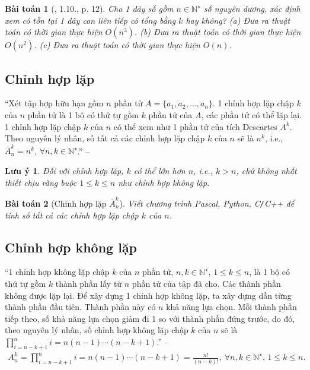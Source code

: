 \documentclass{article}
\newtheorem{baitoan}{Bài toán}
\newtheorem{luuy}{Lưu ý}
\begin{document}
\begin{baitoan}[\cite{TLGK_chuyen_Tin_quyen_1}, 1.10., p. 12]
	Cho 1 dãy số gồm $n\in\mathbb{N}^\star$ số nguyên dương, xác định xem có tồn tại 1 dãy con liên tiếp có tổng bằng $k$ hay không? (a) Đưa ra thuật toán có thời gian thực hiện $O(n^3)$. (b) Đưa ra thuật toán có thời gian thực hiện $O(n^2)$. (c) Đưa ra thuật toán có thời gian thực hiện $O(n)$.
\end{baitoan}

\subsection{Chỉnh hợp lặp}
``Xét tập hợp hữu hạn gồm $n$ phần tử $A = \{a_1,a_2,\ldots,a_n\}$. 1 chỉnh  hợp lặp chập $k$ của $n$ phần tử là 1 bộ có thứ tự gồm $k$ phần tử của $A$, các phần tử có thể lặp lại. 1 chỉnh hợp lặp chập $k$ của $n$ có thể xem như 1 phần tử của tích Descartes $A^k$. Theo nguyên lý nhân, số tất cả các chỉnh hợp lặp chập $k$ của $n$ sẽ là $n^k$, i.e., $\overline{A}_n^k = n^k$, $\forall n,k\in\mathbb{N}^\star$.'' -- \cite[Sect. 4.7, p. 20]{TLGK_chuyen_Tin_quyen_1}

\begin{luuy}
	Đối với chỉnh hợp lặp, $k$ có thể lớn hơn $n$, i.e., $k > n$, chứ không nhất thiết chịu ràng buộc $1\le k\le n$ như chỉnh hợp không lặp.
\end{luuy}

\begin{baitoan}[Chỉnh hợp lặp $\overline{A}_n^k$]
	Viết chương trình {\sf Pascal, Python, C\texttt{/}C++} để tính số tất cả các chỉnh hợp lặp chập $k$ của $n$.
\end{baitoan}

\subsection{Chỉnh hợp không lặp}
``1 chỉnh hợp không lặp chập $k$ của $n$ phần tử, $n,k\in\mathbb{N}^\star$, $1\le k\le n$, là 1 bộ có thứ tự gồm $k$ thành phần lấy từ $n$ phần tử của tập đã cho. Các thành phần không được lặp lại. Để xây dựng 1 chỉnh hợp không lặp, ta xây dựng dần từng thành phần đầu tiên. Thành phần này có $n$ khả năng lựa chọn. Mỗi thành phần tiếp theo, số khả năng lựa chọn giảm đi 1 so với thành phần đứng trước, do đó, theo nguyên lý nhân, số chỉnh hợp không lặp chập $k$ của $n$ sẽ là $\prod_{i=n-k+1}^n i = n(n - 1)\cdots(n - k + 1)$.'' -- \cite[Sect. 4.8, pp. 20--21]{TLGK_chuyen_Tin_quyen_1}
\begin{align*}
	A_n^k = \prod_{i=n-k+1}^n i = n(n - 1)\cdots(n - k + 1) = \frac{n!}{(n - k)!},\ \forall n,k\in\mathbb{N}^\star,\,1\le k\le n.
\end{align*}
\end{document}

